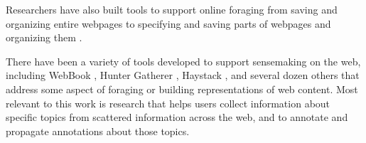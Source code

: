 Researchers have also built tools to support online foraging from saving and organizing entire webpages \cite{card1996webbook} to specifying and saving parts of webpages and organizing them \cite{dontcheva2006collecting, dontcheva2007relations,sugiura1998internet,zhu2002hunter,chang2016supporting}.

There have been a variety of tools developed to support sensemaking on the web, including WebBook \cite{card1996webbook}, Hunter Gatherer \cite{zhu2002hunter}, Haystack \cite{karger2004haystack}, and several dozen others that address some aspect of foraging or building representations of web content. Most relevant to this work is research that helps users collect information about specific topics from scattered information across the web, and to annotate and propagate annotations about those topics.




